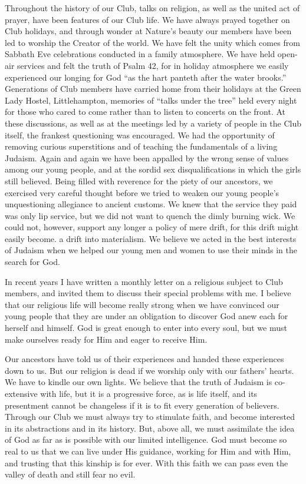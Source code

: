 \documentclass[14pt, article, extrafontsizes, twopage, a4paper]{memoir}
\begin{document}
Throughout the history of our Club, talks on religion,
as well as the united act of prayer, have been features of
our Club life. We have always prayed together on Club
holidays, and through wonder at Nature’s beauty our
members have been led to worship the Creator of the
world. We have felt the unity which comes from
Sabbath Eve celebrations conducted in a family atmosphere.
We have held open-air services and felt the truth
of Psalm 42, for in holiday atmosphere we easily experienced
our longing for God “as the hart panteth after the
water brooks.” Generations of Club members have
carried home from their holidays at the Green Lady
Hostel, Littlehampton, memories of “talks under the
tree” held every night for those who cared to come
rather than to listen to concerts on the front. At these
discussions, as well as at the meetings led by a variety of
people in the Club itself, the frankest questioning was
encouraged. We had the opportunity of removing curious
superstitions and of teaching the fundamentals of a living
Judaism. Again and again we have been appalled by
the wrong sense of values among our young people, and
at the sordid sex disqualifications in which the girls still
believed. Being filled with reverence for the piety of our
ancestors, we exercised very careful thought before we
tried to weaken our young people’s unquestioning allegiance
to ancient customs. We knew that the service they
paid was only lip service, but we did not want to quench
the dimly burning wick. We could not, however, support
any longer a policy of mere drift, for this drift might
easily become. a drift into materialism. We believe we
acted in the best interests of Judaism when we helped our
young men and women to use their minds in the search
for God.

In recent years I have written a monthly letter on a
religious subject to Club members, and invited them to
discuss their special problems with me. I believe that
our religious life will become really strong when we have
convinced our young people that they are under an
obligation to discover God anew each for herself and himself.
God is great enough to enter into every soul, but we
must make ourselves ready for Him and eager to receive
Him.

Our ancestors have told us of their experiences and
handed these experiences down to us. But our religion is
dead if we worship only with our fathers’ hearts. We
have to kindle our own lights. We believe that the truth
of Judaism is co-extensive with life, but it is a progressive
force, as is life itself, and its presentment cannot be
changeless if it is to fit every generation of believers.
Through our Club we must always try to stimulate faith,
and become interested in its abstractions and in its history.
But, above all, we must assimilate the idea of God as far as
is possible with our limited intelligence. God must
become so real to us that we can live under His guidance,
working for Him and with Him, and trusting that this
kinship is for ever. With this faith we can pass even the
valley of death and still fear no evil.
\end{document}

